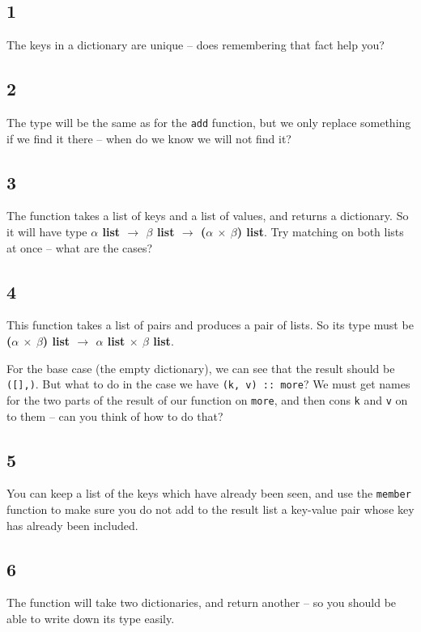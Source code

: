 \documentclass[]{book}
\begin{document}
\begin{multicols*}{2}
\subsection*{1}
The keys in a dictionary are unique -- does remembering that fact help you?

\subsection*{2}
The type will be the same as for the \texttt{add} function, but we only replace something if we find it there -- when do we know we will not find it?

\subsection*{3}
The function takes a list of keys and a list of values, and returns a dictionary. So it will have type \textbf{\textsf{$\alpha$ list $\rightarrow$ $\beta$ list $\rightarrow$ \textmd{(}$\alpha$ $\times$ $\beta$\textmd{)} list}}. Try matching on both lists at once -- what are the cases?

\subsection*{4}
This function takes a list of pairs and produces a pair of lists. So its type must be \textsf{\textbf{\textmd{(}$\alpha$ $\times$ $\beta$\textmd{)} list $\rightarrow$ $\alpha$ list $\times$ $\beta$ list}}.

For the base case (the empty dictionary), we can see that the result should be \texttt{([],\! [])}. But what to do in the case we have \texttt{(k, v)\! :: \!\!\!\!more}? We must get names for the two parts of the result of our function on \texttt{more}, and then cons \texttt{k} and \texttt{v} on to them -- can you think of how to do that?

\subsection*{5}
You can keep a list of the keys which have already been seen, and use the \texttt{member} function to make sure you do not add to the result list a key-value pair whose key has already been included.

\subsection*{6}
The function will take two dictionaries, and return another -- so you should be able to write down its type easily.


\end{multicols*}
\end{document}
